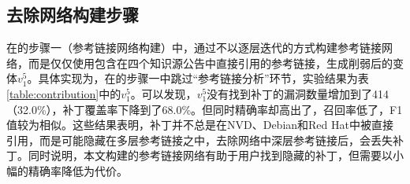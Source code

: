 \subsection{去除网络构建步骤}
在\tool 的步骤一（参考链接网络构建）中，通过不以逐层迭代的方式构建参考链接网络，而是仅仅使用包含在四个知识源公告中直接引用的参考链接，生成削弱后的变体$v_1^5$。具体实现为，在\tool 的步骤一中跳过“参考链接分析”环节，实验结果为表\ref{table:contribution}中的$v_1^5$。可以发现，$v_1^5$没有找到补丁的漏洞数量增加到了414（32.0\%），补丁覆盖率下降到了68.0\%。但同时精确率却高出了，召回率低了，F1值较为相似。这些结果表明，补丁并不总是在NVD、Debian和Red Hat中被直接引用，而是可能隐藏在多层参考链接之中，去除网络中深层参考链接后，会丢失补丁。同时说明，本文构建的参考链接网络有助于用户找到隐藏的补丁，但需要以小幅的精确率降低为代价。

